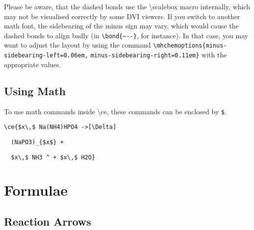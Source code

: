 \documentclass[a4paper,notitlepage]{scrreprt}
\newcommand\macro[1]{{\ttfamily\textbackslash#1}}
\newcommand\fromversion[1]{\marginpar{{\scriptsize version$\geq$#1}}}
\begin{document}
\medskip
\begin{SideBySideExample}[xrightmargin=5cm]
\end{SideBySideExample}

\medskip
\begin{SideBySideExample}[xrightmargin=5cm]
\end{SideBySideExample}

\medskip

\noindent
Please be aware, that the dashed bonds use the \macro{scalebox} macro internally, which may not be visualised correctly by some DVI viewers. If you switch to  another math font, the sidebearing of the minus sign may vary, which would cause  the dashed bonds to align badly (in \verb|\bond{~--}|, for instance). In that  case, you may want to adjust the layout by using the command  \verb|\mhchemoptions{minus-sidebearing-left=0.06em,| \verb|minus-sidebearing-right=0.11em}| with the appropriate values.


\subsection{Using Math}

To 
\fromversion{3.05}
use math commands inside \macro{ce}, these commands can be enclosed by \verb|$|.

\medskip
\begin{SideBySideExample}[xrightmargin=5cm]
\end{SideBySideExample}

\medskip
\noindent{}\par
\noindent\hspace{5cm}\verb|\ce{$x\,$ Na(NH4)HPO4 ->[\Delta]|\par
\noindent\hspace{5cm}\verb|  (NaPO3)_{$x$} +|\par
\noindent\hspace{5cm}\verb|  $x\,$ NH3 ^ + $x\,$ H2O}|



\section{Formulae}

\subsection{Reaction Arrows}
\end{document}
